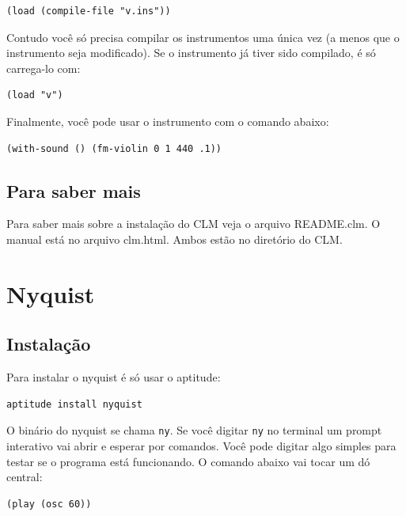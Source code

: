 \documentclass[brazil]{book}
\begin{document}
\begin{verbatim}
(load (compile-file "v.ins"))
\end{verbatim}

Contudo você só precisa compilar os instrumentos uma única vez (a
menos que o instrumento seja modificado). Se o instrumento já tiver
sido compilado, é só carrega-lo com:

\begin{verbatim}
(load "v")
\end{verbatim}

Finalmente, você pode usar o instrumento com o comando abaixo:

\begin{verbatim}
(with-sound () (fm-violin 0 1 440 .1)) 
\end{verbatim}

\section{Para saber mais}
\label{sec:para-saber-mais}

Para saber mais sobre a instalação do CLM veja o arquivo README.clm.
O manual está no arquivo clm.html. Ambos estão no diretório do CLM.

\chapter{Nyquist}
\label{cha:nyquist}

\section{Instalação}
\label{sec:instalacao-1}

Para instalar o nyquist é só usar o aptitude:

\begin{verbatim}
aptitude install nyquist
\end{verbatim}

O binário do nyquist se chama \texttt{ny}. Se você digitar \texttt{ny}
no terminal um prompt interativo vai abrir e esperar por comandos.
Você pode digitar algo simples para testar se o programa está
funcionando. O comando abaixo vai tocar um dó central:

\begin{verbatim}
(play (osc 60))
\end{verbatim}
\end{document}
